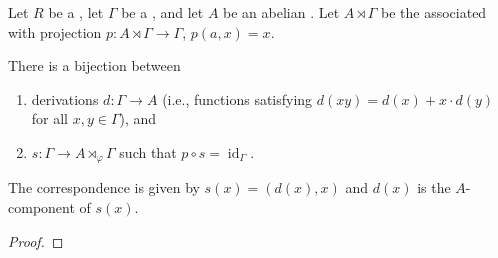 \begin{corollary} \label{corollary:derivations_of_a_group_into_a_group_module_correspond_to_sections_of_semidirect_product_projection}
    Let $R$ be a , let $\Gamma$ be a , and let $A$ be an abelian . Let $A \rtimes \Gamma$ be the associated  with projection $p: A \rtimes \Gamma \to \Gamma$, $p(a,x) = x$.

    There is a bijection between
    \begin{enumerate}
        \item derivations $d: \Gamma \to A$ (i.e., functions satisfying $d(xy) = d(x) + x \cdot d(y)$ for all $x,y \in \Gamma$), and
        \item {} $s: \Gamma \to A \rtimes_\varphi \Gamma$ such that $p \circ s = \operatorname{id}_\Gamma$.
    \end{enumerate}
    The correspondence is given by $s(x) = (d(x), x)$ and $d(x)$ is the $A$-component of $s(x)$.
\end{corollary}
\begin{proof}
    \TODO{}
\end{proof}
